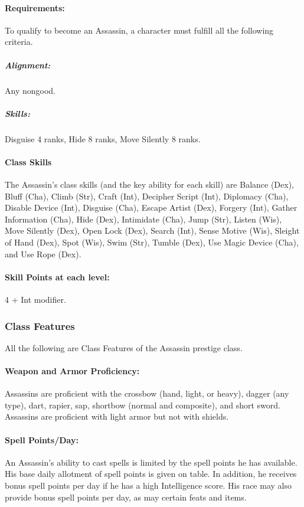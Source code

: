 \paragraph{Requirements:}
To qualify to become an Assassin, a character must fulfill all the following criteria.
\subparagraph{Alignment:} Any nongood.
\subparagraph{Skills:} Disguise 4 ranks, Hide 8 ranks, Move Silently 8 ranks.
\paragraph{Class Skills}
The Assassin's class skills (and the key ability for each skill) are Balance (Dex), Bluff (Cha), Climb (Str), Craft (Int), Decipher Script (Int), Diplomacy (Cha), Disable Device (Int), Disguise (Cha), Escape Artist (Dex), Forgery (Int), Gather Information (Cha), Hide (Dex), Intimidate (Cha), Jump (Str), Listen (Wis), Move Silently (Dex), Open Lock (Dex), Search (Int), Sense Motive (Wis), Sleight of Hand (Dex), Spot (Wis), Swim (Str), Tumble (Dex), Use Magic Device (Cha), and Use Rope (Dex).
\paragraph{Skill Points at each level:} 4 + Int modifier.

\subsubsection{Class Features}
All the following are Class Features of the Assassin prestige class.

\paragraph{Weapon and Armor Proficiency:}
Assassins are proficient with the crossbow (hand, light, or heavy), dagger (any type), dart, rapier, sap, shortbow (normal and composite), and short sword. 
Assassins are proficient with light armor but not with shields.

\paragraph{Spell Points/Day:} 
An Assassin's ability to cast spells is limited by the spell points he has available. 
His base daily allotment of spell points is given on  table. 
In addition, he receives bonus spell points per day if he has a high Intelligence score.
His race may also provide bonus spell points per day, as may certain feats and items.

